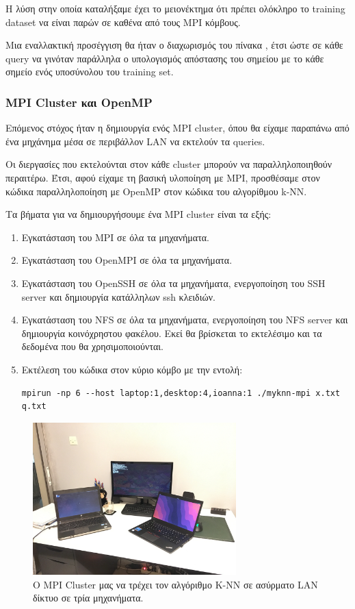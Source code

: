 \documentclass[11pt]{scrartcl} %
\begin{document}
Η λύση στην οποία καταλήξαμε έχει το μειονέκτημα ότι πρέπει ολόκληρο το training dataset να είναι παρών σε καθένα από 
τους MPI κόμβους.

Μια εναλλακτική προσέγγιση θα ήταν ο διαχωρισμός του πίνακα , έτσι ώστε σε κάθε query
να γινόταν παράλληλα ο υπολογισμός απόστασης του σημείου  με το κάθε σημείο ενός υποσύνολου του training set.

\subsubsection{MPI Cluster και OpenMP}

Επόμενος στόχος ήταν η δημιουργία ενός MPI cluster, όπου θα είχαμε παραπάνω από ένα μηχάνημα μέσα σε περιβάλλον LAN να εκτελούν τα queries.

Οι διεργασίες που εκτελούνται στον κάθε cluster μπορούν να παραλληλοποιηθούν περαιτέρω.
Έτσι, αφού είχαμε τη βασική υλοποίηση με MPI, προσθέσαμε στον κώδικα παραλληλοποίηση με OpenMP στον κώδικα του αλγορίθμου k-NN.

Τα βήματα για να δημιουργήσουμε ένα MPI cluster είναι τα εξής:

\begin{enumerate}
\item Εγκατάσταση του MPI σε όλα τα μηχανήματα.
\item Εγκατάσταση του OpenMPI σε όλα τα μηχανήματα.
\item Εγκατάσταση του OpenSSH σε όλα τα μηχανήματα, ενεργοποίηση του SSH server και δημιουργία κατάλληλων ssh κλειδιών.
\item Εγκατάσταση του NFS \cite{nfs} σε όλα τα μηχανήματα, ενεργοποίηση του NFS server και
        δημιουργία κοινόχρηστου φακέλου. Εκεί θα βρίσκεται το εκτελέσιμο και τα
        δεδομένα που θα χρησιμοποιούνται.
\item Εκτέλεση του κώδικα στον κύριο κόμβο με την εντολή:
\begin{lstlisting}
mpirun -np 6 --host laptop:1,desktop:4,ioanna:1 ./myknn-mpi x.txt q.txt
\end{lstlisting}
\end{enumerate}

\begin{figure}
    \begin{center}
        \includegraphics[width=0.7\textwidth]{assets/mpi_cluster.png}
    \end{center}
    \caption{Ο MPI Cluster μας να τρέχει τον αλγόριθμο K-NN σε ασύρματο LAN δίκτυο σε τρία μηχανήματα.}
    \label{fig:}
\end{figure}
\end{document}

